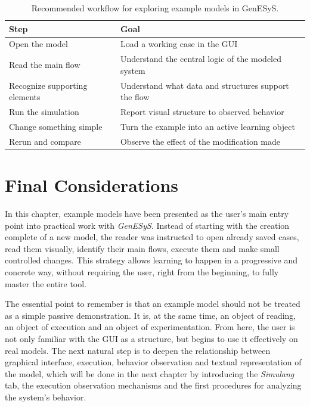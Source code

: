 \begin{table}[htbp]
\centering
\caption{Recommended workflow for exploring example models in GenESyS.}
 \label{tab:cap4_roteiro_modelos_exemplo}
\small
 \begin{tabular}{|p{4.2cm}|p{7.1cm}|}
\hline
\textbf{Step} & \textbf{Goal} \\
\hline
Open the model & Load a working case in the GUI \\
\hline
Read the main flow & Understand the central logic of the modeled system \\
\hline
Recognize supporting elements & Understand what data and structures support the flow \\
\hline
Run the simulation & Report visual structure to observed behavior \\
\hline
Change something simple & Turn the example into an active learning object \\
\hline
Rerun and compare & Observe the effect of the modification made \\
\hline
 \end{tabular}
\end{table}

\section{Final Considerations}
\label{sec:cap4_consideracoes_finais}

In this chapter, example models have been presented as the user's main entry point into practical work with \textit{GenESyS}. Instead of starting with the creation complete of a new model, the reader was instructed to open already saved cases, read them visually, identify their main flows, execute them and make small controlled changes. This strategy allows learning to happen in a progressive and concrete way, without requiring the user, right from the beginning, to fully master the entire tool.

The essential point to remember is that an example model should not be treated as a simple passive demonstration. It is, at the same time, an object of reading, an object of execution and an object of experimentation. From here, the user is not only familiar with the GUI as a structure, but begins to use it effectively on real models. The next natural step is to deepen the relationship between graphical interface, execution, behavior observation and textual representation of the model, which will be done in the next chapter by introducing the \textit{Simulang} tab, the execution observation mechanisms and the first procedures for analyzing the system's behavior.

